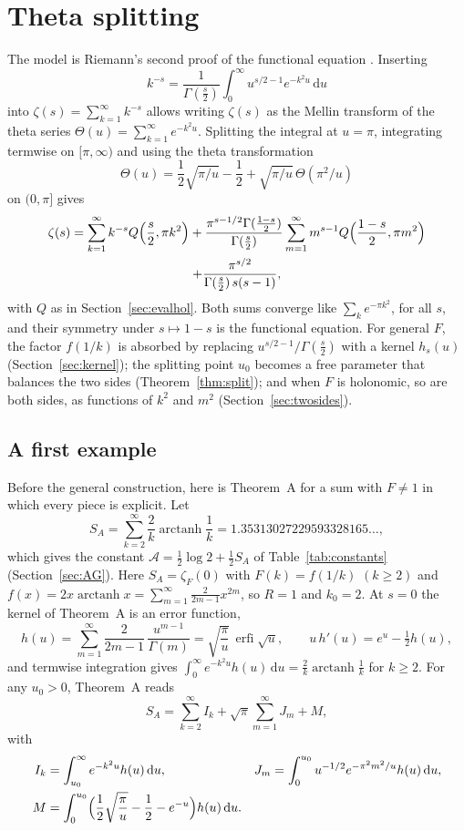 \documentclass[11pt,reqno]{amsart}
\theoremstyle{definition}
\theoremstyle{remark}
\newcommand{\erfi}{\operatorname{erfi}}
\newcommand{\arctanh}{\operatorname{arctanh}}
\newcommand{\dd}{\,\mathrm{d}}
\begin{document}
\section{Theta splitting}\label{sec:splitting}

The model is Riemann's second proof of the functional equation \cite{Rie59}. Inserting
\[
k^{-s} = \frac{1}{\Gamma(\tfrac s2)} \int_0^\infty u^{s/2-1}e^{-k^2u}\dd u
\]
into $\zeta(s) = \sum_{k=1}^{\infty}k^{-s}$
allows writing $\zeta(s)$ as the Mellin transform of the theta series $\Theta(u) = \sum_{k=1}^{\infty}e^{-k^2u}$. Splitting the
integral at $u = \pi$, integrating termwise on $[\pi,\infty)$ and using the theta transformation
\[
\Theta(u) = \frac12\sqrt{\pi/u} - \frac12 + \sqrt{\pi/u}\,\Theta(\pi^2/u)
\]
on $(0,\pi]$ gives
\begin{multline}\label{eq:riemann}
  \zeta(s) = \sum_{k=1}^{\infty}k^{-s}Q\Bigl(\frac s2,\pi k^2\Bigr)
  + \frac{\pi^{s-1/2}\Gamma(\frac{1-s}2)}{\Gamma(\frac s2)}\sum_{m=1}^{\infty}m^{s-1}Q\Bigl(\frac{1-s}2,\pi m^2\Bigr) \\
  + \frac{\pi^{s/2}}{\Gamma(\frac s2)\,s(s-1)},
\end{multline}
with $Q$ as in Section~\ref{sec:evalhol}. Both sums converge like $\sum_ke^{-\pi k^2}$, for all $s$, and their symmetry
under $s \mapsto 1-s$ is the functional equation. For general $F$, the factor $f(1/k)$ is absorbed by replacing
$u^{s/2-1}/\Gamma(\frac s2)$ with a kernel $h_s(u)$ (Section~\ref{sec:kernel}); the splitting point $u_0$ becomes a
free parameter that balances the two sides (Theorem~\ref{thm:split}); and when $F$ is holonomic, so are both sides,
as functions of $k^2$ and $m^2$ (Section~\ref{sec:twosides}). %

\subsection{A first example}\label{sec:workedexample}
Before the general construction, here is Theorem~A for a sum with $F \ne 1$ in which every piece is explicit. Let
\[
  S_A = \sum_{k=2}^{\infty}\frac2k\arctanh\frac1k = 1.35313027229593328165\ldots,
\]
which gives the constant $\mathcal A = \frac12\log2 + \frac12S_A$ of Table~\ref{tab:constants}
(Section~\ref{sec:AG}). Here $S_A = \zeta_F(0)$ with $F(k) = f(1/k)$ $(k \ge 2)$ and
$f(x) = 2x\arctanh x = \sum_{m=1}^{\infty}\frac{2}{2m-1}x^{2m}$, so $R = 1$ and $k_0 = 2$. At $s = 0$ the kernel of
Theorem~A is an error function,
\[
  h(u) = \sum_{m=1}^{\infty}\frac{2}{2m-1}\,\frac{u^{m-1}}{\Gamma(m)} = \sqrt{\frac\pi u}\,\erfi\sqrt u, \qquad
  u\,h'(u) = e^u - \tfrac12h(u),
\]
and termwise integration gives $\int_0^\infty e^{-k^2u}h(u)\dd u = \frac2k\arctanh\frac1k$ for $k \ge 2$. For any
$u_0 > 0$, Theorem~A reads
\[
  S_A = \sum_{k=2}^{\infty}I_k + \sqrt\pi\sum_{m=1}^{\infty}J_m + M,
\]
with
\begin{align*}
  I_k &= \int_{u_0}^\infty e^{-k^2u}h(u)\dd u, &
  J_m &= \int_0^{u_0}u^{-1/2}e^{-\pi^2m^2/u}h(u)\dd u, \\
  M &= \int_0^{u_0}\Bigl(\frac12\sqrt{\frac\pi u} - \frac12 - e^{-u}\Bigr)h(u)\dd u .
\end{align*}
\end{document}
